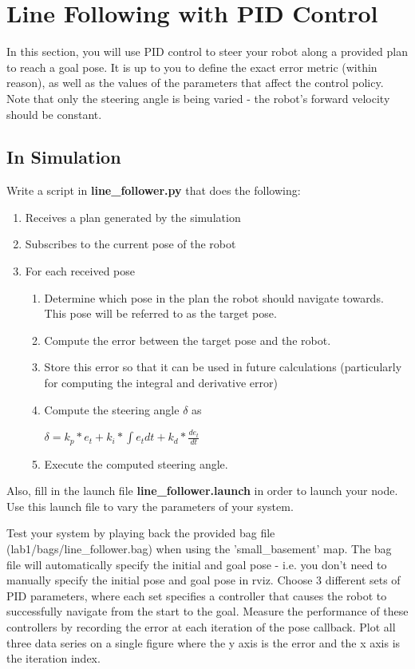 \documentclass[final]{article}
\begin{document}
\section{Line Following with PID Control}
In this section, you will use PID control to steer your robot along a provided plan to reach a goal  pose. It is up to you to define the exact error metric (within reason), as well as the values of the parameters that affect the control policy. Note that only the steering angle is being varied - the robot's forward velocity should be constant.

\subsection{In Simulation}
Write a script in \textbf{line\_follower.py} that does the following:

\begin{enumerate}
\item Receives a plan generated by the simulation
\item Subscribes to the current pose of the robot
\item For each received pose
 \begin{enumerate}
 \item Determine which pose in the plan the robot should navigate towards. This pose will be referred to as the target pose.
 \item Compute the error between the target pose and the robot.
 \item Store this error so that it can be used in future calculations (particularly for computing the integral and derivative error)
 \item Compute the steering angle $\delta$ as \\
 
  \centerline{$\delta = k_p*e_t + k_i* \int e_t dt + k_d* \frac{de_t}{dt}$}
 
 \item Execute the computed steering angle. 
 \end{enumerate}
\end{enumerate}

Also, fill in the launch file \textbf{line\_follower.launch} in order to launch your node. Use this launch file to vary the parameters of your system.

Test your system by playing back the provided bag file (lab1/bags/line\_follower.bag) when using the 'small\_basement' map. The bag file will automatically specify the initial and goal pose - i.e. you don't need to manually specify the initial pose and goal pose in rviz. Choose 3 different sets of PID parameters, where each set specifies a controller that causes the robot to successfully navigate from the start to the goal. Measure the performance of these controllers by recording the error at each iteration of the pose callback. Plot all three data series on a single figure where the y axis is the error and the x axis is the iteration index.
\end{document}
